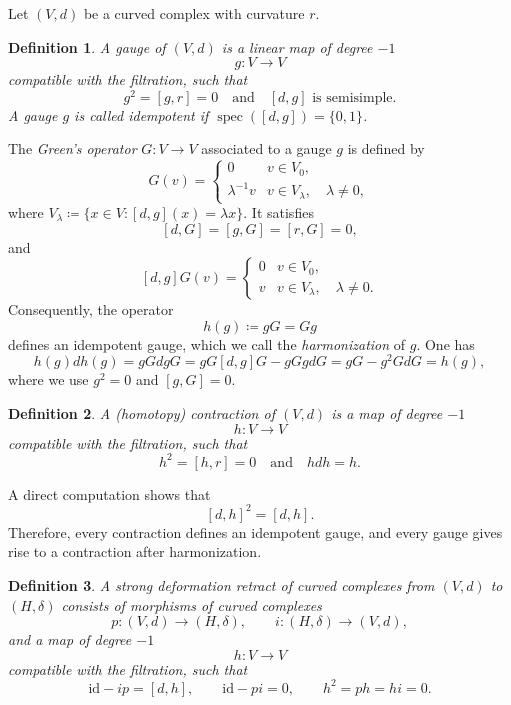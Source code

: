 \documentclass[12pt]{amsart}
\newtheorem{defn}{Definition}[section]
\numberwithin{equation}{section}
\theoremstyle{plain}
\newcommand{\id}{\mathrm{id}}
\begin{document}
	Let $(V,d)$ be a curved complex with curvature $r$.
	
	\begin{defn}
		A \emph{gauge} of $(V,d)$ is a linear map of degree $-1$
		\[
		g \colon V \longrightarrow V
		\]
		compatible with the filtration, such that
		\[
		g^2 = [g,r] = 0
		\quad \text{and} \quad
		[d,g] \text{~is~semisimple}.
		\]
		A gauge $g$ is called \emph{idempotent} if $\operatorname{spec}([d,g])=\{0,1\}$.
	\end{defn}
	
	The \emph{Green's operator} $G \colon V \to V$ associated to a gauge $g$ is defined by
	\[
	G(v) = \begin{cases}
		0 & v \in V_0, \\
		\lambda^{-1} v & v \in V_\lambda, \quad \lambda \neq 0,
	\end{cases}
	\]
	where $V_\lambda \coloneqq \{x \in V \colon [d,g](x) = \lambda x\}$. It satisfies
	\[
	[d, G] = [g, G] = [r,G] = 0, 
	\]
	and
	\[
	[d,g]G(v) = \begin{cases}
		0 & v \in V_0 ,\\
		v & v \in V_\lambda, \quad  \lambda \neq 0.
	\end{cases}
	\]
	Consequently, the operator
	\[
	h(g)\coloneqq gG = Gg
	\]
	defines an idempotent gauge, which we call the \emph{harmonization} of $g$. 
	One has
	\[
	h(g) d h(g) = gGdgG = gG[d,g]G-gGgdG = gG - g^2 GdG = h(g),
	\]
	where we use $g^2= 0$ and $[g,G]=0$. 
	
	\begin{defn}
		A \emph{(homotopy) contraction} of $(V,d)$ is a map of degree $-1$ 
		\[
		h \colon V \longrightarrow V
		\]
		compatible with the filtration, such that
		\[
		h^2 = [h,r] = 0
		\quad \text{and} \quad
		hdh = h.
		\]
	\end{defn}
	
    A direct computation shows that
	\[
	[d,h]^2= [d,h].
	\]
	Therefore, every contraction defines an idempotent gauge, and every gauge gives rise to a contraction after harmonization.
	
	\begin{defn}
		A \emph{strong deformation retract} of curved complexes from $(V,d)$ to $(H, \delta)$ consists of morphisms of curved complexes
		\[
		p \colon (V,d) \longrightarrow (H, \delta),
		\qquad
		i \colon (H,\delta) \longrightarrow (V,d),
		\]
		and a map of degree $-1$
		\[
		h \colon V \longrightarrow V
		\]
		compatible with the filtration, such that
		\begin{equation*}
			\id - ip = [d,h],
			\qquad
			\id - pi = 0,
			\qquad
			h^2 = ph = hi = 0.
		\end{equation*}
	\end{defn}
	
\end{document}
